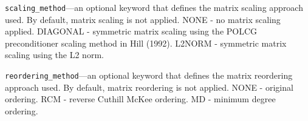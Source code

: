 \begin{description}
\item \texttt{scaling\_method}---an optional keyword that defines the matrix scaling approach used. By default, matrix scaling is not applied.  NONE - no matrix scaling applied.  DIAGONAL - symmetric matrix scaling using the POLCG preconditioner scaling method in Hill (1992).  L2NORM - symmetric matrix scaling using the L2 norm.

\item \texttt{reordering\_method}---an optional keyword that defines the matrix reordering approach used. By default, matrix reordering is not applied.  NONE - original ordering.  RCM - reverse Cuthill McKee ordering.  MD - minimum degree ordering.

\end{description}

